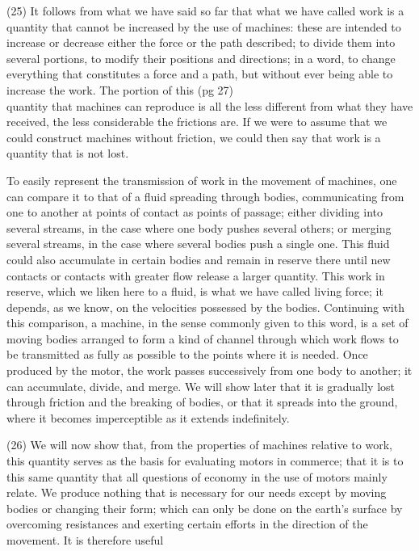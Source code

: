 \documentclass{book}
\begin{document}
(25) It follows from what we have said so far that what we have called work is a quantity that cannot be increased by the use of machines: these are intended to increase or decrease either the force or the path described; to divide them into several portions, to modify their positions and directions; in a word, to change everything that constitutes a force and a path, but without ever being able to increase the work. The portion of this 
\newpage
(pg 27) \\
quantity that machines can reproduce is all the less different from what they have received, the less considerable the frictions are. If we were to assume that we could construct machines without friction, we could then say that work is a quantity that is not lost.

To easily represent the transmission of work in the movement of machines, one can compare it to that of a fluid spreading through bodies, communicating from one to another at points of contact as points of passage; either dividing into several streams, in the case where one body pushes several others; or merging several streams, in the case where several bodies push a single one. This fluid could also accumulate in certain bodies and remain in reserve there until new contacts or contacts with greater flow release a larger quantity. This work in reserve, which we liken here to a fluid, is what we have called living force; it depends, as we know, on the velocities possessed by the bodies. Continuing with this comparison, a machine, in the sense commonly given to this word, is a set of moving bodies arranged to form a kind of channel through which work flows to be transmitted as fully as possible to the points where it is needed. Once produced by the motor, the work passes successively from one body to another; it can accumulate, divide, and merge. We will show later that it is gradually lost through friction and the breaking of bodies, or that it spreads into the ground, where it becomes imperceptible as it extends indefinitely.

(26) We will now show that, from the properties of machines relative to work, this quantity serves as the basis for evaluating motors in commerce; that it is to this same quantity that all questions of economy in the use of motors mainly relate.
We produce nothing that is necessary for our needs except by moving bodies or changing their form; which can only be done on the earth's surface by overcoming resistances and exerting certain efforts in the direction of the movement. It is therefore useful 
\end{document}
